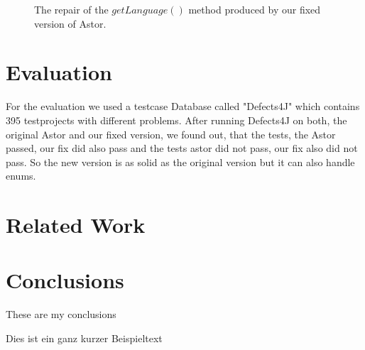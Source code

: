 \documentclass[pdftex,english,oribibl]{llncs}
\begin{document}
\begin{figure}
\begin{center}

\end{center}
\caption{The repair of the $getLanguage()$ method produced by our fixed version of Astor.}
\label{fig:fixed}
\end{figure}

\section{Evaluation}\label{sec:evaluation}
For the evaluation we used a testcase Database called "Defects4J" which contains 395 testprojects with different problems. After running Defects4J on both, the original Astor and our fixed version, we found out, that the tests, the Astor passed, our fix did also pass and the tests astor did not pass, our fix also did not pass. So the new version is as solid as the original version but it can also handle enums.

\section{Related Work}\label{sec:relatedWork}

\section{Conclusions}\label{sec:conclusions}

  These are my conclusions 

Dies ist ein ganz kurzer Beispieltext \cite{AspectJ2007}


\end{document}
